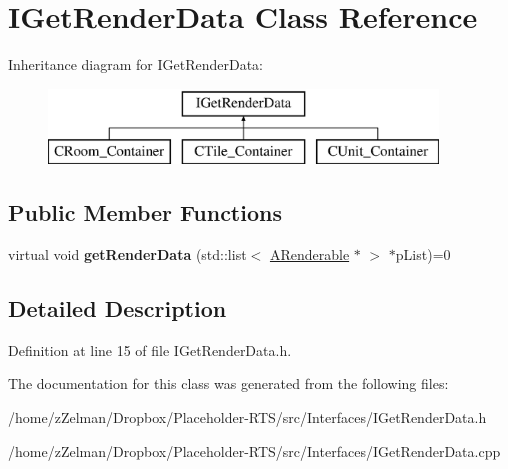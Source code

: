 \hypertarget{classIGetRenderData}{\section{I\-Get\-Render\-Data Class Reference}
\label{classIGetRenderData}
}
Inheritance diagram for I\-Get\-Render\-Data\-:\begin{figure}[H]
\begin{center}
\leavevmode
\includegraphics[height=2.000000cm]{classIGetRenderData}
\end{center}
\end{figure}
\subsection*{Public Member Functions}
\begin{DoxyCompactItemize}
\item 
\hypertarget{classIGetRenderData_ac98527f07b6d1b5030786b4848cca867}{virtual void {\bfseries get\-Render\-Data} (std\-::list$<$ \hyperlink{classARenderable}{A\-Renderable} $\ast$ $>$ $\ast$p\-List)=0}\label{classIGetRenderData_ac98527f07b6d1b5030786b4848cca867}

\end{DoxyCompactItemize}


\subsection{Detailed Description}


Definition at line 15 of file I\-Get\-Render\-Data.\-h.



The documentation for this class was generated from the following files\-:\begin{DoxyCompactItemize}
\item 
/home/z\-Zelman/\-Dropbox/\-Placeholder-\/\-R\-T\-S/src/\-Interfaces/I\-Get\-Render\-Data.\-h\item 
/home/z\-Zelman/\-Dropbox/\-Placeholder-\/\-R\-T\-S/src/\-Interfaces/I\-Get\-Render\-Data.\-cpp\end{DoxyCompactItemize}
